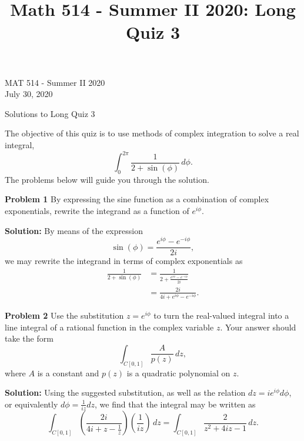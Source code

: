 \documentclass[12pt,oneside]{exam}
\title{Math 514 - Summer II 2020: Long Quiz 3}
\newenvironment{exercise}[1]{\vspace{.1in}\noindent\textbf{Problem #1 \hspace{.05em}}}{}
\begin{document}
\begin{flushright}
\sc MAT 514 - Summer II 2020\\
July 30, 2020
\end{flushright}
\bigskip
 
\begin{center}
\textsf{Solutions to Long Quiz 3} 
\end{center}

The objective of this quiz is to use methods of complex integration to solve a real integral, 
\begin{equation*}
\int_{0}^{2\pi} \frac{1}{2+\sin(\phi)}\, d\phi.
\end{equation*}
The problems below will guide you through the solution. 

\begin{exercise}{1}
By expressing the sine function as a combination of complex exponentials, rewrite the integrand as a function of $e^{i\phi}$. 
\end{exercise}

\vspace{0.5cm}

\noindent \textbf{Solution:} By means of the expression 
\begin{equation*}
\sin(\phi) = \frac{e^{i\phi}-e^{-i\phi}}{2i},
\end{equation*}
we may rewrite the integrand in terms of complex exponentials as
\begin{align*}
\frac{1}{2+\sin(\phi)}	& = \frac{1}{2+\frac{e^{i\phi}-e^{-i\phi}}{2i}} \\
& = \frac{2i}{4i+e^{i\phi}-e^{-i\phi}}.
\end{align*}

\vspace{1cm}

\begin{exercise}{2}
Use the substitution $z=e^{i\phi}$ to turn the real-valued integral into a line integral of a rational function in the complex variable $z$. Your answer should take the form
\begin{equation*}
\int_{C[0,1]} \frac{A}{p(z)} \, dz,
\end{equation*}
where $A$ is a constant and $p(z)$ is a quadratic polynomial on $z$.
\end{exercise}

\vspace{0.5cm}

\noindent \textbf{Solution:} Using the suggested substitution, as well as the relation $dz = ie^{i\phi}d\phi$, or equivalently $d\phi = \frac{1}{iz}dz$, we find that the integral may be written as 
\begin{equation*}
\int_{C[0,1]} \left(\frac{2i}{4i +z -\frac{1}{z}} \right)\left( \frac{1}{iz}\right) \, dz = \int_{C[0,1]} \frac{2}{z^2+4iz-1}\, dz.
\end{equation*}
\end{document}
